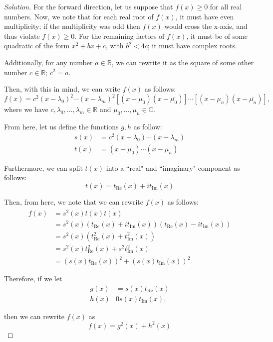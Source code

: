 \documentclass[openany]{book}
\newenvironment{solution}{\begin{proof}[Solution]}{\end{proof}}
\newcommand{\CC}{\mathbb{C}}
\newcommand{\RR}{\mathbb{R}}
\begin{document}
\begin{solution}
	For the forward direction, let us suppose that $f(x) \geq 0$ for all real numbers. Now, we note that for each real root of $f(x)$, it must have even multiplicity; if the multiplicity was odd then $f(x)$ would cross the x-axis, and thus violate $f(x) \geq 0$. For the remaining factors of $f(x)$, it must be of some quadratic of the form $x^{2} + bx + c$, with $b^{2} < 4c$; it must have complex roots.
	
	Additionally, for any number $a \in \RR$, we can rewrite it as the square of some other number $c \in \RR$; $c^{2} = a$.
	
	Then, with this in mind, we can write $f(x)$ as follows:
	\begin{equation*}
		f(x) = c^{2}(x-\lambda_0)^{2}\cdots(x-\lambda_m)^{2}[(x-\mu_0)(x-\overline{\mu_0})]\cdots[(x-\mu_n)(x-\overline{\mu_n})],
	\end{equation*}
	where we have $c, \lambda_0, \ldots, \lambda_m \in \RR$ and $\mu_0,\ldots,\mu_n \in \CC$.
	
	From here, let us define the functions $g,h$ as follow:
	\begin{align*}
		s(x) &= c^{2}(x-\lambda_0)\cdots(x-\lambda_m) \\
		t(x) &= (x-\mu_0)\cdots(x-\mu_n)
	\end{align*}

	Furthermore, we can split $t(x)$ into a ``real" and ``imaginary" component as follows:
	\begin{equation*}
		t(x) = t_{\mathrm{Re}}(x) + it_{\mathrm{Im}}(x)
	\end{equation*}

	Then, from here, we note that we can rewrite $f(x)$ as follows:
	\begin{align*}
		f(x) &= s^{2}(x)t(x)\overline{t(x)} \\
		&= s^{2}(x)(t_{\mathrm{Re}}(x) + it_{\mathrm{Im}}(x))(t_{\mathrm{Re}}(x) - it_{\mathrm{Im}}(x)) \\
		&= s^{2}(x)(t^{2}_{\mathrm{Re}}(x) + t^{2}_{\mathrm{Im}}(x)) \\
		&= s^{2}(x)t^{2}_{\mathrm{Re}}(x) + s^{2}t^{2}_{\mathrm{Im}}(x) \\
		&= (s(x)t_{\mathrm{Re}}(x))^{2} + (s(x)t_{\mathrm{Im}}(x))^{2} 
	\end{align*}

	Therefore, if we let
	\begin{align*}
		g(x) &= s(x)t_{\mathrm{Re}}(x) \\
		h(x) &0 s(x)t_{\mathrm{Im}}(x),
	\end{align*}

	then we can rewrite $f(x)$ as
	\begin{equation*}
		f(x) = g^{2}(x) + h^{2}(x)
	\end{equation*}
\end{solution}
\end{document}
